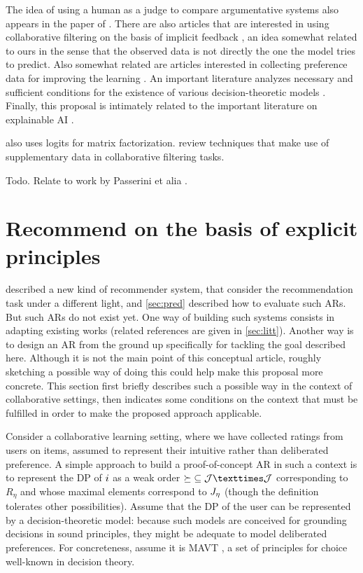 \documentclass[french, english]{da2pl2018}
\begin{document}
The idea of using a human as a judge to compare argumentative systems also appears in the paper of \citet{irving_ai_2018}.
There are also articles that are interested in using collaborative filtering on the basis of implicit feedback \citep{rendle_bpr:_2009, hu_collaborative_2008}, an idea somewhat related to ours in the sense that the observed data is not directly the one the model tries to predict.
Also somewhat related are articles interested in collecting preference data for improving the learning \citep{sepliarskaia_preference_2018}.
An important literature analyzes necessary and sufficient conditions for the existence of various decision-theoretic models \citep{krantz_foundations_1971, gonzales_additive_1996, bouyssou_consolidated_2015}.
Finally, this proposal is intimately related to the important literature on explainable AI \citep{DBLP:journals/corr/abs-1804-11192}.

\citet{johnson_logistic_2014} also uses logits for matrix factorization. \citet{chen_attribute-aware_2018} review techniques that make use of supplementary data in collaborative filtering tasks.

Todo. Relate to work by Passerini et alia \citep{teso_constructive_2016, teso_coactive_2017, dragone_constructive_2018, erculiani_automating_2018, dragone_no_2018}.

\section{Recommend on the basis of explicit principles}
\label{sec:princ}
 described a new kind of recommender system, that consider the recommendation task under a different light, and \cref{sec:pred} described how to evaluate such \acp{AR}. But such \acp{AR} do not exist yet. One way of building such systems consists in adapting existing works (related references are given in \cref{sec:litt}). Another way is to design an \ac{AR} from the ground up specifically for tackling the goal described here. Although it is not the main point of this conceptual article, roughly sketching a possible way of doing this could help make this proposal more concrete. This section first briefly describes such a possible way in the context of collaborative settings, then indicates some conditions on the context that must be fulfilled in order to make the proposed approach applicable.

Consider a collaborative learning setting, where we have collected ratings from users on items, assumed to represent their intuitive rather than deliberated preference. 
A simple approach to build a proof-of-concept \ac{AR} in such a context is to represent the \ac{DP} of $i$ as a weak order ${\succeq} \subseteq \allitems × \allitems$ corresponding to $R_\eta$ and whose maximal elements correspond to $J_{\eta}$ (though the definition tolerates other possibilities).
Assume that the \ac{DP} of the user can be represented by a decision-theoretic model: because such models are conceived for grounding decisions in sound principles, they might be adequate to model deliberated preferences. %
For concreteness, assume it is \ac{MAVT} \citep{keeney_decisions_1993}, a set of principles for choice well-known in decision theory.
\end{document}
